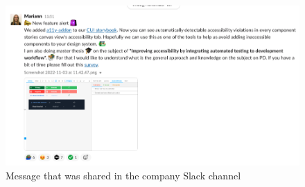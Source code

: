 \documentclass{master_thesis_section}
\begin{document}
\begin{figure}[h]
	\includegraphics[width=\textwidth]{img/survey_2.png}
	\caption{Message that was shared in the company Slack channel}
	\label{fig:slack-message}
\end{figure}
\end{document}
